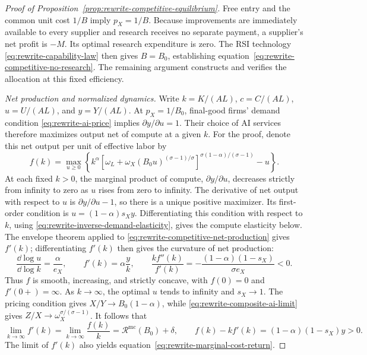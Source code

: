 \begin{proof}[Proof of Proposition~\ref{prop:rewrite-competitive-equilibrium}]
\label{proof:rewrite-competitive-equilibrium}
Free entry and the common unit cost $1/B$ imply $p_X=1/B$.
Because improvements are immediately available to every supplier and
research receives no separate payment, a supplier's net profit is $-M$.
Its optimal research expenditure is zero. The RSI technology
\eqref{eq:rewrite-capability-law} then gives $B=B_0$, establishing
equation~\eqref{eq:rewrite-competitive-no-research}. The remaining
argument constructs and verifies the allocation at this fixed efficiency.

\emph{Net production and normalized dynamics.}
Write $k=K/(AL)$, $c=C/(AL)$, $u=U/(AL)$, and $y=Y/(AL)$.
At $p_X=1/B_0$, final-good firms' demand condition
\eqref{eq:rewrite-ai-price} implies $\partial y/\partial u=1$.
Their choice of AI services therefore maximizes output net of compute
at a given $k$. For the proof, denote this net output per unit of
effective labor by
\begin{equation}
 f(k)=\max_{u\geq0}\left\{
 k^\alpha\left[\omega_L+\omega_X(B_0u)^{(\sigma-1)/\sigma}\right]^{
 \sigma(1-\alpha)/(\sigma-1)}-u\right\}.
 \label{eq:rewrite-competitive-net-production}
\end{equation}
At each fixed $k>0$, the marginal product of compute, $\partial y/\partial u$,
decreases strictly from infinity to zero as $u$ rises from zero to
infinity. The derivative of net output with respect to $u$ is
$\partial y/\partial u-1$,
so there is a unique positive maximizer. Its first-order condition is
$u=(1-\alpha)s_Xy$. Differentiating this condition with respect to $k$, using
\eqref{eq:rewrite-inverse-demand-elasticity}, gives the compute elasticity
below. The envelope theorem applied to
\eqref{eq:rewrite-competitive-net-production} gives $f'(k)$;
differentiating $f'(k)$ then gives the curvature of net production:
\[
 \frac{\dd\log u}{\dd\log k}=\frac{\alpha}{e_X},\qquad
 f'(k)=\alpha\frac{y}{k},\qquad
 \frac{kf''(k)}{f'(k)}
 =-\frac{(1-\alpha)(1-s_X)}{\sigma e_X}<0.
\]
Thus $f$ is smooth, increasing, and strictly concave, with $f(0)=0$
and $f'(0+)=\infty$. As $k\to\infty$, the optimal $u$ tends to
infinity and $s_X\to1$. The pricing condition gives
$X/Y\to B_0(1-\alpha)$, while
\eqref{eq:rewrite-composite-ai-limit} gives
$Z/X\to\omega_X^{\sigma/(\sigma-1)}$. It follows that
\begin{equation}
 \lim_{k\to\infty}f'(k)=\lim_{k\to\infty}\frac{f(k)}k
 =\mathcal R^{\mathrm{mc}}(B_0)+\delta,
 \qquad
 f(k)-kf'(k)=(1-\alpha)(1-s_X)y>0.
 \label{eq:rewrite-competitive-net-limits}
\end{equation}
The limit of $f'(k)$ also yields equation~\eqref{eq:rewrite-marginal-cost-return}.


\end{proof}
